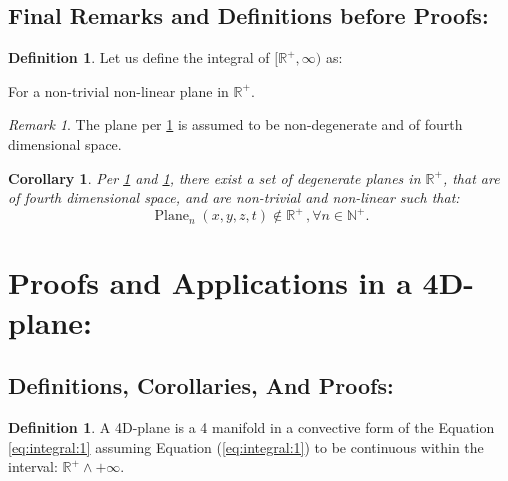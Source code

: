 \documentclass[10pt]{article}
\theoremstyle{plain}
\newtheorem{corollary}[theorem]{Corollary}
\theoremstyle{definition}
\newtheorem{definition}[theorem]{Definition}
\theoremstyle{remark}
\newtheorem{remark}[theorem]{Remark}
\begin{document}
\subsection{Final Remarks and Definitions before Proofs:}

\begin{definition}
\label{def:plane-1}
Let us define the integral of $[\mathbb{R}^{+}, \infty)$ as:
\begin{center}
\end{center}
For a non-trivial non-linear plane in $\mathbb{R}^{+}$.
\end{definition}
\begin{remark}
\label{rem:plane-1}
The plane per \ref{def:plane-1} is assumed to be non-degenerate and of fourth dimensional space.
\end{remark}

\begin{corollary}
Per \ref{def:plane-1} and \ref{rem:plane-1}, there exist a set of degenerate planes in $\mathbb{R}^{+}$, that are of fourth dimensional space, and are non-trivial and non-linear such that:
\begin{equation}
  \operatorname{Plane}_{n}(x, y, z, t) \notin \mathbb{R}^{+}\, , \forall n \in \mathbb{N}^{+}.
\end{equation}
\end{corollary}

\section{Proofs and Applications in a 4D-plane:}

\subsection{Definitions, Corollaries, And Proofs:}

\begin{definition}
\label{def:plane-4d}
A 4D-plane is a 4 manifold in a convective form of the Equation \ref{eq:integral:1} assuming Equation (\ref{eq:integral:1}) to be continuous within the interval: $\mathbb{R}^{+} \land +\infty$.
\end{definition}
\end{document}
